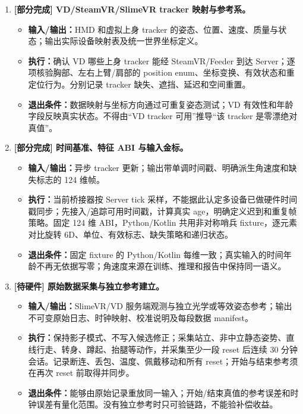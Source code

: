 \documentclass[UTF8,11pt,a4paper]{ctexart}
\begin{document}
\begin{enumerate}
  \item \textbf{[部分完成] VD/SteamVR/SlimeVR tracker 映射与参考系。}
  \begin{itemize}
    \item \textbf{输入/输出：}HMD 和虚拟上身 tracker 的姿态、位置、速度、质量与状态；输出实际设备映射表及统一世界坐标定义。
    \item \textbf{执行：}确认 VD 哪些上身 tracker 能经 SteamVR/Feeder 到达 Server；逐项核验胸部、左右上臂/肩部的 position enum、坐标变换、有效状态和重定位行为。分别记录 tracker 缺失、遮挡、延迟和空间重置。
    \item \textbf{退出条件：}数据映射与坐标方向通过可重复姿态测试；VD 有效性和年龄字段反映真实状态。不得由“VD tracker 可用”推导“该 tracker 是零漂绝对真值”。
  \end{itemize}

  \item \textbf{[部分完成] 时间基准、特征 ABI 与输入金标。}
  \begin{itemize}
    \item \textbf{输入/输出：}异步 tracker 更新；输出带单调时间戳、明确派生角速度和缺失标志的 124 维帧。
    \item \textbf{执行：}当前桥接器按 Server tick 采样，不能据此认定多设备已做硬件时间戳同步；先接入/追踪可用时间戳，计算真实 age，明确定义迟到和重复帧策略。固定 124 维 ABI，Python/Kotlin 共用非对称哨兵 fixture，逐元素对比旋转 6D、单位、有效标志、缺失策略和递归状态。
    \item \textbf{退出条件：}固定 fixture 的 Python/Kotlin 每维一致；真实输入的时间年龄不再无依据写零；角速度来源在训练、推理和报告中保持同一语义。
  \end{itemize}

  \item \textbf{[待硬件] 原始数据采集与独立参考建立。}
  \begin{itemize}
    \item \textbf{输入/输出：}SlimeVR/VD 服务端观测与独立光学或等效姿态参考；输出不可变原始日志、时钟映射、校准说明及每段数据 manifest。
    \item \textbf{执行：}保持影子模式、不写入候选修正；采集站立、非中立静态姿势、直线行走、转身、蹲起、抬腿等动作，并采集至少一段 reset 后连续 30 分钟会话。记录断连、丢包、温度、佩戴移动和所有 reset；开始与结束参考须在再次 reset 前取得并同步。
    \item \textbf{退出条件：}能够由原始记录重放同一输入；开始/结束真值的参考误差和时钟误差有量化范围。没有独立参考时只可验链路，不能验补偿收益。
  \end{itemize}


\end{enumerate}
\end{document}
